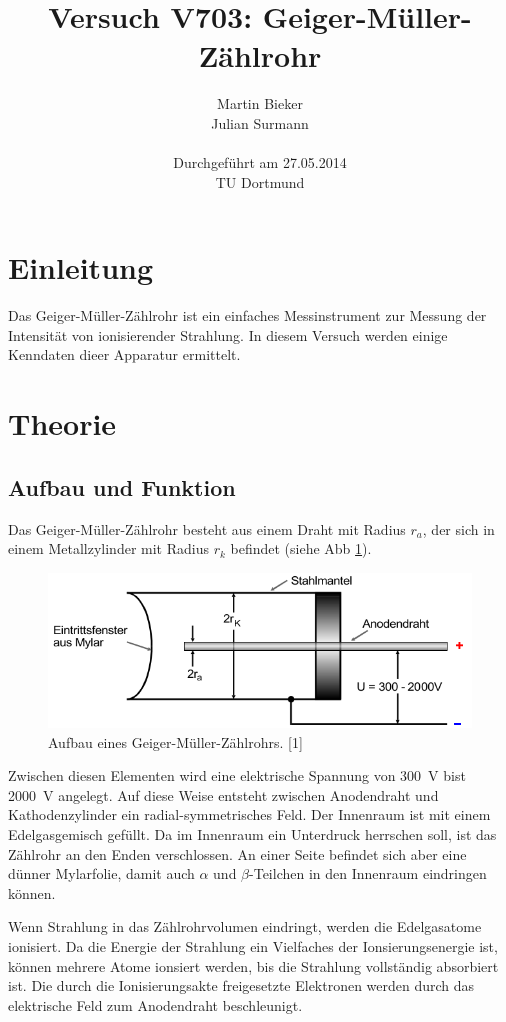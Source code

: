 \documentclass[11pt,ngerman,a4paper]{article}
\title{\textbf{Versuch V703: Geiger-Müller-Zählrohr}}
\author{Martin Bieker\\
		Julian Surmann\\
		\\
		Durchgef\"{u}hrt am 27.05.2014\\
		TU Dortmund}
\date{}
\begin{document}
\renewcommand\tablename{Tabelle}
\renewcommand\figurename{Abbildung}
\maketitle
\thispagestyle{empty}
\newpage
\clearpage
\setcounter{page}{1}


\section{Einleitung}
Das Geiger-Müller-Zählrohr ist ein einfaches Messinstrument zur Messung der Intensität von ionisierender Strahlung. In diesem Versuch werden einige Kenndaten dieer Apparatur ermittelt.
\section{Theorie}
\subsection{Aufbau und Funktion} 
 Das Geiger-Müller-Zählrohr besteht aus einem Draht  mit Radius $r_a$, der sich in einem Metallzylinder mit Radius $r_k$ befindet (siehe Abb \ref{abb1}). 
\begin{figure}[htp]
\centering
\includegraphics[scale=0.6]{abb1.png}
\caption{Aufbau eines Geiger-Müller-Zählrohrs. [1]}
\label{abb1}
\end{figure} 
Zwischen diesen Elementen wird eine elektrische Spannung von \SI{300}{\volt} bist \SI{2000}{\volt} angelegt. Auf diese Weise entsteht zwischen Anodendraht und Kathodenzylinder ein radial-symmetrisches Feld. Der Innenraum ist mit einem  Edelgasgemisch gefüllt. Da im Innenraum ein Unterdruck herrschen soll, ist das Zählrohr an den Enden verschlossen. An einer Seite befindet sich aber eine dünner Mylarfolie, damit  auch $\alpha$ und $\beta$-Teilchen in den Innenraum eindringen können.
 
 \noindent
 Wenn Strahlung in das Zählrohrvolumen eindringt, werden die Edelgasatome ionisiert. Da die Energie der Strahlung ein Vielfaches der Ionsierungsenergie ist, können mehrere Atome ionsiert werden, bis die Strahlung vollständig absorbiert ist. Die durch die Ionisierungsakte freigesetzte Elektronen werden durch das elektrische Feld  zum Anodendraht beschleunigt.
\end{document}
